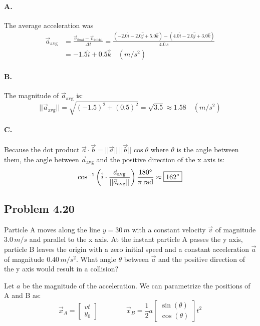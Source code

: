 \documentclass[12pt]{article}
\begin{document}
\paragraph{A.} The average acceleration was
\begin{align*}\vec{a}_\text{avg} &= \frac{\vec{v}_\text{final} - \vec{v}_\text{initial}}{\Delta t} = \frac{(-2.0\hat{i}-2.0\hat{j}+5.0\hat{k}) - (4.0 \hat{i} - 2.0\hat{j} + 3.0\hat{k})}{4.0\,\si{s}}\\&= \boxed{-1.5\hat{i} + 0.5\hat{k}\quad(\si{m/s^2})}\end{align*} 

\paragraph{B.} The magnitude of $\vec{a}_\text{avg}$ is:
\[|| \vec{a}_\text{avg} || = \sqrt{(-1.5)^2 + (0.5)^2} = \sqrt{3.5} \approx \boxed{1.58\quad(\si{m/s^2})}\]

\paragraph{C.} Because the dot product $\vec{a}\cdot\vec{b} = \lvert\lvert \vec{a}\rvert\rvert\,\lvert\lvert \vec{b}\rvert\rvert \cos{\theta}$ where $\theta$ is the angle between them, the angle between $\vec{a}_\text{avg}$ and the positive direction of the x axis is:
\[\cos^{-1}\left(\hat{i}\cdot \frac{\vec{a}_\text{avg}}{||\vec{a}_\text{avg}||}\right) \frac{180\degree}{\pi\,\si{rad}}\approx \boxed{162\degree}\]

\newpage
\subsection{Problem 4.20}
Particle A moves along the line $y = 30\,\si{m}$ with a constant velocity $\vec{v}$ of magnitude $3.0\,\si{m/s}$ and parallel to the x axis. At the instant particle A passes the y axis, particle B leaves the origin with a zero initial speed and a constant acceleration $\vec{a}$ of magnitude $0.40\,\si{m/s^2}$. What angle $\theta$ between $\vec{a}$ and the positive direction of the y axis would result in a collision? \newline

Let $a$ be the magnitude of the acceleration. We can parametrize the positions of A and B as:
 \[
\vec{x}_A = \begin{bmatrix}vt \\ y_0\end{bmatrix} \qquad\qquad \vec{x}_B = \frac{1}{2} a \begin{bmatrix}\sin(\theta) \\ \cos(\theta) \end{bmatrix} t^2
\]
\end{document}
